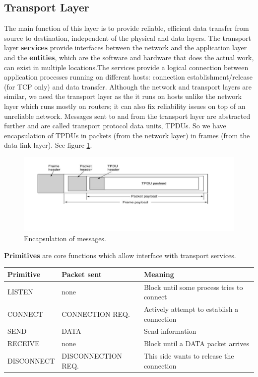 \documentclass[twoside]{article}
\begin{document}
\subsection{Transport Layer}
The main function of this layer is to provide reliable, efficient data transfer
from source to destination, independent of the physical and data layers. The
transport layer \textbf{services} provide interfaces between the network and 
the application layer and the \textbf{entities}, which are the software and 
hardware that does the actual work, can exist in multiple locations.The services 
provide a logical connection between application processes running on different
hosts: connection establishment/release (for TCP only) and data transfer. 
Although the network and transport layers are similar, we need the transport 
layer as the it runs on hosts unlike the network layer which runs mostly on 
routers; it can also fix reliability issues on top of an unreliable network. 
Messages sent to and from the transport layer are abstracted further and are
called transport protocol data units, TPDUs. So we have encapsulation of TPDUs
in packets (from the network layer) in frames (from the data link layer). See
figure \ref{fig:encaps}.
\begin{figure}
  \includegraphics[width=\linewidth]{encaps.png}
  \caption{Encapsulation of messages.}
  \label{fig:encaps}
\end{figure}
\textbf{Primitives} are core functions which allow interface with transport 
services.
\begin{center}
    \begin{tabular}{| l | l | l |}
        \hline \textbf{Primitive} & \textbf{Packet sent} & \textbf{Meaning} \\ \hline
        \hline LISTEN & none & Block until some process tries to connect \\ \hline
        \hline CONNECT & CONNECTION REQ. & Actively attempt to establish a connection \\ \hline
        \hline SEND & DATA & Send information \\ \hline
        \hline RECEIVE & none & Block until a DATA packet arrives \\ \hline
        \hline DISCONNECT & DISCONNECTION REQ. & This side wants to release the connection \\ \hline
    \end{tabular}
\end{center}
\end{document}
